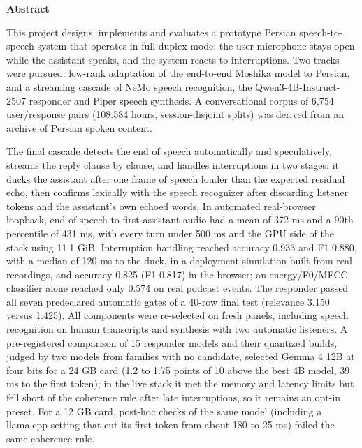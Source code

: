 \begingroup
\setlength{\parskip}{0.3em}
\linespread{1.2}\selectfont
\begin{center}
\textbf{Abstract}
\end{center}

This project designs, implements and evaluates a prototype Persian
speech-to-speech system that operates in full-duplex mode: the user microphone
stays open while the assistant speaks, and the system reacts to interruptions.
Two tracks were pursued: low-rank adaptation of the end-to-end Moshika model to
Persian, and a streaming cascade of NeMo speech recognition, the
Qwen3-4B-Instruct-2507 responder and Piper speech synthesis. A conversational
corpus of 6,754 user/response pairs (108.584 hours, session-disjoint splits) was
derived from an archive of Persian spoken content.

The final cascade detects the end of speech automatically and speculatively,
streams the reply clause by clause, and handles interruptions in two stages: it
ducks the assistant after one frame of speech louder than the expected
residual echo, then confirms lexically with the speech recognizer after
discarding listener tokens and the assistant's own echoed words. In automated
real-browser loopback, end-of-speech to first assistant audio had a mean of
372 ms and a 90th percentile of 431 ms, with every turn under 500 ms and the
GPU side of the stack using 11.1 GiB. Interruption handling reached accuracy 0.933 and F1 0.880, with a
median of 120 ms to the duck, in a deployment simulation built from real
recordings, and accuracy 0.825 (F1 0.817) in the browser; an energy/F0/MFCC classifier
alone reached only 0.574 on real podcast events. The responder passed all seven
predeclared automatic gates of a 40-row final test (relevance 3.150 versus
1.425). All components were re-selected on fresh panels, including speech
recognition on human transcripts and synthesis with two automatic listeners. A
pre-registered comparison of 15 responder models and their quantized builds,
judged by two models from families with no candidate, selected Gemma 4 12B at
four bits for a 24 GB card (1.2 to 1.75 points of 10 above the best 4B model,
39 ms to the first token); in the live stack it met the memory and latency
limits but fell short of the coherence rule after late interruptions, so it
remains an opt-in preset. For a 12 GB card, post-hoc checks of the same model
(including a llama.cpp setting that cut its first token from about 180 to 25 ms)
failed the same coherence rule.

